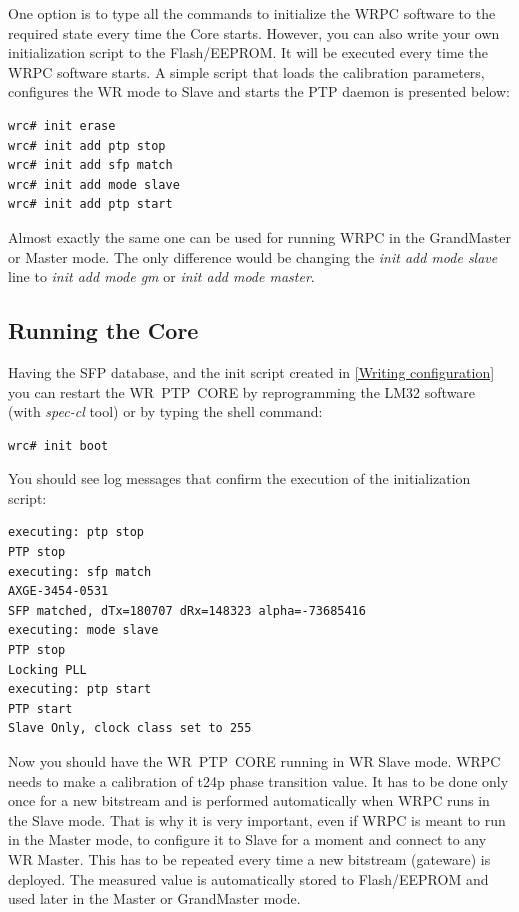 \documentclass[a4paper, 12pt]{article}
\newcommand{\codeHook}[1]{\mbox{\ttfamily\MakeTextUppercase{#1}}}
\begin{document}
\vspace{1em}
One option is to type all the commands to initialize the \codeHook{wrpc} software to
the required state every time the Core starts. However, you can also write your
own initialization script to the Flash/EEPROM. It will be executed every time
the \codeHook{wrpc} software starts. A simple script that loads the calibration
parameters, configures the \codeHook{wr} mode to Slave and starts the \codeHook{ptp} daemon
is presented below:

\begin{lstlisting}
wrc# init erase
wrc# init add ptp stop
wrc# init add sfp match
wrc# init add mode slave
wrc# init add ptp start
\end{lstlisting}

Almost exactly the same one can be used for running \codeHook{wrpc} in the GrandMaster
or Master mode. The only difference would be changing the
\textit{init add mode slave} line to \textit{init add mode gm} or
\textit{init add mode master}.

\subsection{Running the Core}
\label{Running the Core}

Having the \codeHook{sfp} database, and the init script created in \ref{Writing
configuration} you can restart the \codeHook{wr ptp core} by reprogramming the
\codeHook{lm32} software (with \textit{spec-cl} tool) or by typing the shell command:

\begin{lstlisting}
wrc# init boot
\end{lstlisting}

You should see log messages that confirm the execution of the initialization
script:

\begin{lstlisting}
executing: ptp stop
PTP stop
executing: sfp match
AXGE-3454-0531
SFP matched, dTx=180707 dRx=148323 alpha=-73685416
executing: mode slave
PTP stop
Locking PLL
executing: ptp start
PTP start
Slave Only, clock class set to 255
\end{lstlisting}

Now you should have the \codeHook{wr ptp core} running in \codeHook{wr} Slave mode.
\codeHook{wrpc} needs to make a calibration of t24p phase transition value. It has to
be done only once for a new bitstream and is performed automatically when
\codeHook{wrpc} runs in the Slave mode. That is why it is very important, even if
\codeHook{wrpc} is meant to run in the Master mode, to configure it to Slave for a
moment and connect to any \codeHook{wr} Master. This has to be repeated every time
a new bitstream (gateware) is deployed. The measured value is automatically
stored to Flash/EEPROM and used later in the Master or GrandMaster mode.
\end{document}
